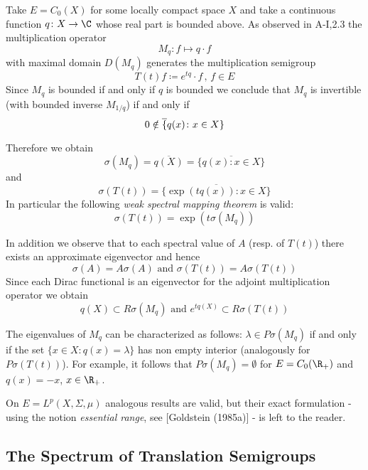 Take $E = C_{0}(X)$ for some locally compact space $X$ and take a continuous function $q \colon X \to \C$ whose real part is bounded above.
As observed in A-I,2.3 the multiplication operator
\[
M_{q} \colon f \mapsto q \cdot f
\]
with maximal domain $D(M_{q})$ generates the multiplication semigroup
\[
T(t)f \coloneqq e^{tq} \cdot f \, , \, f \in E
\]
Since $M_{q}$ is bounded if and only if $q$ is bounded we conclude that $M_{q}$ is invertible (with bounded inverse $M_{1/q}$) if and only if
\[
0 \notin \overline\{{q(x)  \colon x \in X\}}
\]

Therefore we obtain
\[
\sigma(M_{q}) = \overline{q(X)} = \overline{\{q(x) \colon x \in X\}}
\]
and
\[
\sigma(T(t)) = \overline{\{\exp(tq(x)) \colon x \in X\}}
\]
In particular the following \emph{weak spectral mapping theorem} is valid:
\[
\sigma(T(t)) = \exp(t\sigma(M_{q}))
\]

In addition we observe that to each spectral value of $A$ (resp. of $T(t)$) there exists an approximate eigenvector and hence
\[
\sigma(A) = A\sigma(A) \text{ and } \sigma(T(t)) = A\sigma(T(t))
\]
Since each Dirac functional is an eigenvector for the adjoint multiplication operator we obtain
\[
q(X) \subset R\sigma(M_{q}) \text{ and } e^{tq(X)} \subset R\sigma(T(t))
\]


\newpage
The eigenvalues of $M_{q}$ can be characterized as follows:
\newline
$\lambda \in P\sigma(M_{q})$ if and only if the set $\{x \in X \colon q(x) = \lambda\}$ has non empty interior (analogously for $P\sigma(T(t))$).
For example, it follows that $P\sigma(M_{q}) = \emptyset$ for $E = C_{0}(\R_{+})$ and $q(x) = -x$, $x \in \R_{+}$.

On $E = L^{p}(X,\Sigma,\mu)$ analogous results are valid, but their exact formulation - using the notion \emph{essential range}, see [Goldstein (1985a)] - is left to the reader.

\subsection{The Spectrum of Translation Semigroups}\label{subsec:a3-2.4}

